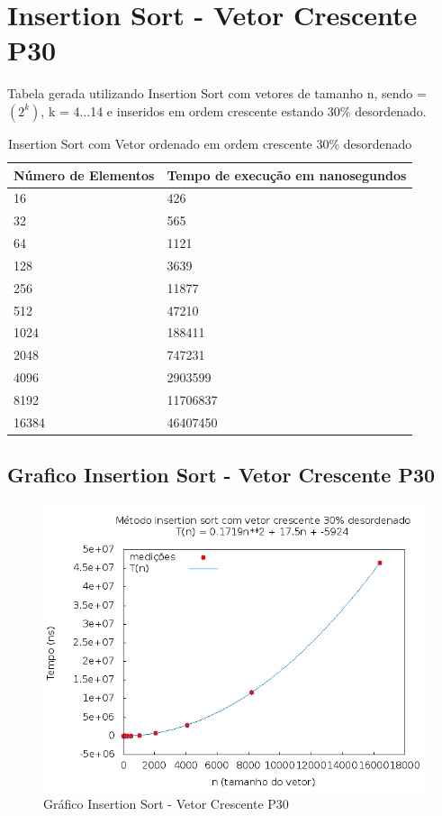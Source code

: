 \documentclass[12pt,a4paper,twoside]{report}
\begin{document}
\section{Insertion Sort - Vetor Crescente P30}
Tabela gerada utilizando Insertion Sort com vetores de tamanho n, sendo = $(2^k)$, k = 4...14 e inseridos em ordem crescente estando 30\% desordenado.

\begin{table}[H]
\centering
\caption{Insertion Sort com Vetor ordenado em ordem crescente 30\% desordenado}
\label{my-label}
\begin{tabular}{|l|l|}
\hline
\multicolumn{1}{|c|}{\textbf{Número de Elementos}} & \multicolumn{1}{c|}{\textbf{Tempo de execução em nanosegundos}} \\ \hline
16 & 426 \\ \hline
32 & 565 \\ \hline
64 & 1121 \\ \hline
128 & 3639 \\ \hline
256 & 11877 \\ \hline
512 & 47210 \\ \hline
1024 & 188411 \\ \hline
2048 & 747231 \\ \hline
4096 & 2903599 \\ \hline
8192 & 11706837 \\ \hline
16384 & 46407450 \\ \hline
\end{tabular}
\end{table}

\subsection{Grafico Insertion Sort - Vetor Crescente P30}
\begin{figure}[H]
    \centering
    \includegraphics[width=0.7\linewidth]{graficos/Insertion/vIntCrescenteP30/vIntCrescenteP30.png}
  \caption{Gráfico Insertion Sort - Vetor Crescente P30}
\end{figure}
\end{document}
